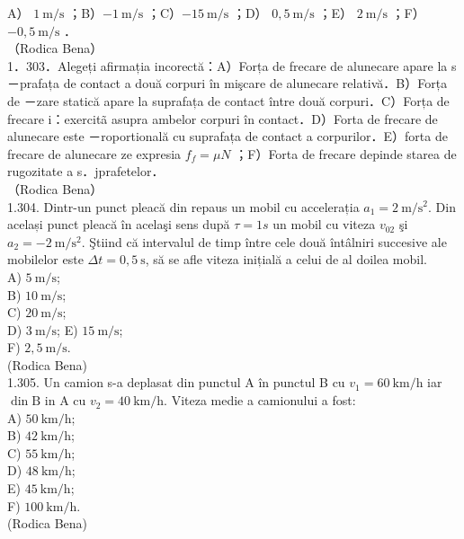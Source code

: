 {A） $1 \mathrm{~m} / \mathrm{s}$ ；B）$-1 \mathrm{~m} / \mathrm{s}$ ；C）$-15 \mathrm{~m} / \mathrm{s}$ ；D） $0,5 \mathrm{~m} / \mathrm{s}$ ；E） $2 \mathrm{~m} / \mathrm{s}$ ；F）$-0,5 \mathrm{~m} / \mathrm{s}$ ．\\
（Rodica Bena）\\
1．303．Alegeți afirmația incorectă：A）Forța de frecare de alunecare apare la s－prafața de contact a două corpuri în mişcare de alunecare relativă．B）Forța de －zare statică apare la suprafața de contact între două corpuri．C）Forța de frecare i：exercitã asupra ambelor corpuri în contact．D）Forta de frecare de alunecare este －roportională cu suprafața de contact a corpurilor．E）forta de frecare de alunecare ze expresia $f_{f}=\mu N$ ；F）Forta de frecare depinde starea de rugozitate a s．jprafetelor．\\
（Rodica Bena）\\
1.304. Dintr-un punct pleacă din repaus un mobil cu accelerația $a_{1}=2 \mathrm{~m} / \mathrm{s}^{2}$. Din același punct pleacă în acelaşi sens după $\tau=1 s$ un mobil cu viteza $v_{02}$ şi $a_{2}=-2 \mathrm{~m} / \mathrm{s}^{2}$. Ştiind că intervalul de timp între cele două întâlniri succesive ale mobilelor este $\Delta t=0,5 \mathrm{~s}$, să se afle viteza inițială a celui de al doilea mobil.\\
A) $5 \mathrm{~m} / \mathrm{s}$;\\
B) $10 \mathrm{~m} / \mathrm{s}$;\\
C) $20 \mathrm{~m} / \mathrm{s}$;\\
D) $3 \mathrm{~m} / \mathrm{s}$; E) $15 \mathrm{~m} / \mathrm{s}$;\\
F) $2,5 \mathrm{~m} / \mathrm{s}$.\\
(Rodica Bena)\\
1.305. Un camion s-a deplasat din punctul A în punctul B cu $v_{1}=60 \mathrm{~km} / \mathrm{h}$ iar $\operatorname{din} \mathrm{B}$ in A cu $v_{2}=40 \mathrm{~km} / \mathrm{h}$. Viteza medie a camionului a fost:\\
A) $50 \mathrm{~km} / \mathrm{h}$;\\
B) $42 \mathrm{~km} / \mathrm{h}$;\\
C) $55 \mathrm{~km} / \mathrm{h}$;\\
D) $48 \mathrm{~km} / \mathrm{h}$;\\
E) $45 \mathrm{~km} / \mathrm{h}$;\\
F) $100 \mathrm{~km} / \mathrm{h}$.\\
(Rodica Bena)\\
}
